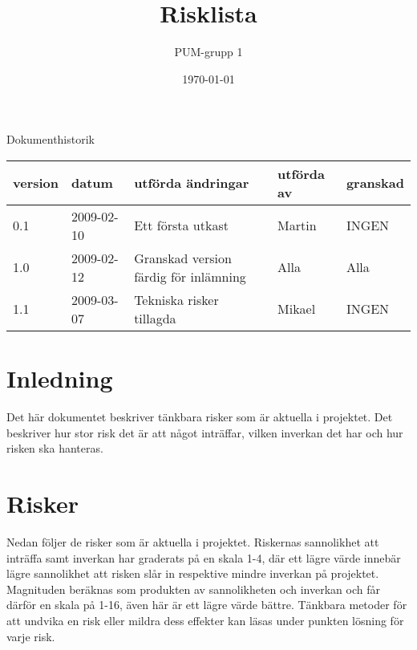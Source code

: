 

\ifpdf
\else
\fi

\title{Risklista}
\author{PUM-grupp 1}
\date{\today}



\maketitle\thispagestyle{empty}

\newpage

{\centering \Large{Dokumenthistorik\\}}

\vspace{10pt}
\begin{tabularx}{\textwidth}{ |l|l|X|l|l| }
  \hline
    \textbf{version} & \textbf{datum} & \textbf{utförda ändringar} & \textbf{utförda av} & \textbf{granskad} \\
	\hline 0.1 & 2009-02-10 & Ett första utkast & Martin & INGEN \\
	\hline 1.0 & 2009-02-12 & Granskad version färdig för inlämning & Alla & Alla \\
	\hline 1.1 & 2009-03-07 & Tekniska risker tillagda & Mikael & INGEN \\
  \hline
\end{tabularx}

\newpage

\setcounter{tocdepth}{2}
\tableofcontents
\newpage

\setcounter{tocdepth}{2}
\newpage

\section{Inledning}
Det här dokumentet beskriver tänkbara risker som är aktuella i projektet. Det beskriver hur stor risk det är att något inträffar, vilken inverkan det har och hur risken ska hanteras.

\section{Risker}
Nedan följer de risker som är aktuella i projektet. Riskernas sannolikhet att inträffa samt inverkan har graderats på en skala 1-4, där ett lägre värde innebär lägre sannolikhet att risken slår in respektive mindre inverkan på projektet. Magnituden beräknas som produkten av sannolikheten och inverkan och får därför en skala på 1-16, även här är ett lägre värde bättre. Tänkbara metoder för att undvika en risk eller mildra dess effekter kan läsas under punkten lösning för varje risk.

